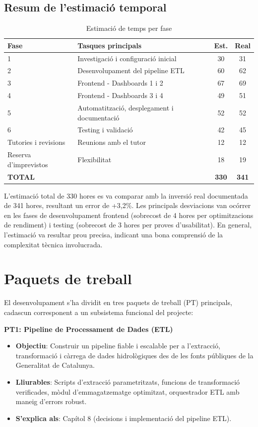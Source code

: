 \subsection{Resum de l'estimació temporal}
\begin{table}[h]
\centering
\small
\caption{Estimació de temps per fase}
\begin{tabular}{|l|l|c|c|}
\hline
\textbf{Fase} & \textbf{Tasques principals} & \textbf{Est.} & \textbf{Real} \\
\hline
1 & Investigació i configuració inicial & 30 & 31 \\
\hline
2 & Desenvolupament del pipeline ETL & 60 & 62 \\
\hline
3 & Frontend - Dashboards 1 i 2 & 67 & 69 \\
\hline
4 & Frontend - Dashboards 3 i 4 & 49 & 51 \\
\hline
5 & Automatització, desplegament i documentació & 52 & 52 \\
\hline
6 & Testing i validació & 42 & 45 \\
\hline
Tutories i revisions & Reunions amb el tutor & 12 & 12 \\
\hline
Reserva d'imprevistos & Flexibilitat & 18 & 19 \\
\hline
\textbf{TOTAL} & & \textbf{330} & \textbf{341} \\
\hline
\end{tabular}
\label{tab:time-estimation}
\end{table}

L'estimació total de 330 hores es va comparar amb la inversió real documentada de 341 hores, resultant un error de +3,2\%. Les principals desviacions van ocórrer en les fases de desenvolupament frontend (sobrecost de 4 hores per optimitzacions de rendiment) i testing (sobrecost de 3 hores per proves d'usabilitat). En general, l'estimació va resultar prou precisa, indicant una bona comprensió de la complexitat tècnica involucrada.


\section{Paquets de treball}

El desenvolupament s'ha dividit en tres paquets de treball (PT) principals, cadascun corresponent a un subsistema funcional del projecte:

\textbf{PT1: Pipeline de Processament de Dades (ETL)}
\begin{itemize}
    \item \textbf{Objectiu}: Construir un pipeline fiable i escalable per a l'extracció, transformació i càrrega de dades hidrològiques des de les fonts públiques de la Generalitat de Catalunya.
    \item \textbf{Lliurables}: Scripts d'extracció parametritzats, funcions de transformació verificades, mòdul d'emmagatzematge optimitzat, orquestrador ETL amb maneig d'errors robust.
    \item \textbf{S'explica als}: Capítol 8 (decisions i implementació del pipeline ETL).
\end{itemize}

